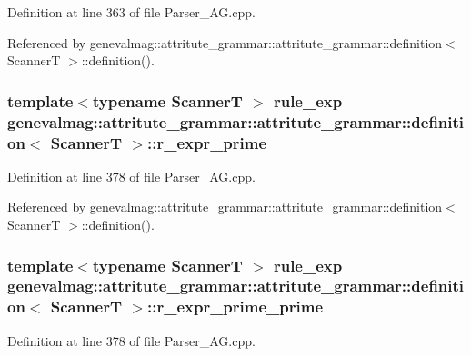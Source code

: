 Definition at line 363 of file Parser\_\-AG.cpp.

Referenced by genevalmag::attritute\_\-grammar::attritute\_\-grammar::definition$<$ ScannerT $>$::definition().\hypertarget{structgenevalmag_1_1attritute__grammar_1_1definition_3502dca656a00c5b653ea6ae07f782e7}{
\subsubsection[{r\_\-expr\_\-prime}]{\setlength{\rightskip}{0pt plus 5cm}template$<$typename ScannerT $>$ {\bf rule\_\-exp} genevalmag::attritute\_\-grammar::attritute\_\-grammar::definition$<$ ScannerT $>$::{\bf r\_\-expr\_\-prime}}}
\label{structgenevalmag_1_1attritute__grammar_1_1definition_3502dca656a00c5b653ea6ae07f782e7}




Definition at line 378 of file Parser\_\-AG.cpp.

Referenced by genevalmag::attritute\_\-grammar::attritute\_\-grammar::definition$<$ ScannerT $>$::definition().\hypertarget{structgenevalmag_1_1attritute__grammar_1_1definition_8f9b90ad2dab7be14d77596ee566d15b}{
\subsubsection[{r\_\-expr\_\-prime\_\-prime}]{\setlength{\rightskip}{0pt plus 5cm}template$<$typename ScannerT $>$ {\bf rule\_\-exp} genevalmag::attritute\_\-grammar::attritute\_\-grammar::definition$<$ ScannerT $>$::{\bf r\_\-expr\_\-prime\_\-prime}}}
\label{structgenevalmag_1_1attritute__grammar_1_1definition_8f9b90ad2dab7be14d77596ee566d15b}




Definition at line 378 of file Parser\_\-AG.cpp.


